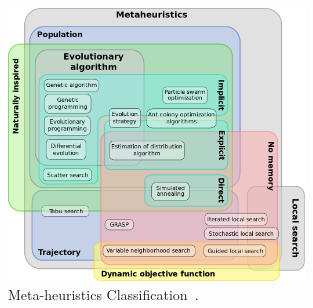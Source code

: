 \begin{figure}
	\centering
	\includegraphics[width=0.7\textwidth]{graphics/Background/Metaheuristics_classification}
	\caption{Meta-heuristics Classification~\cite{wiki_MH_classification}.}
	\label{BG: MH classification}
\end{figure}


